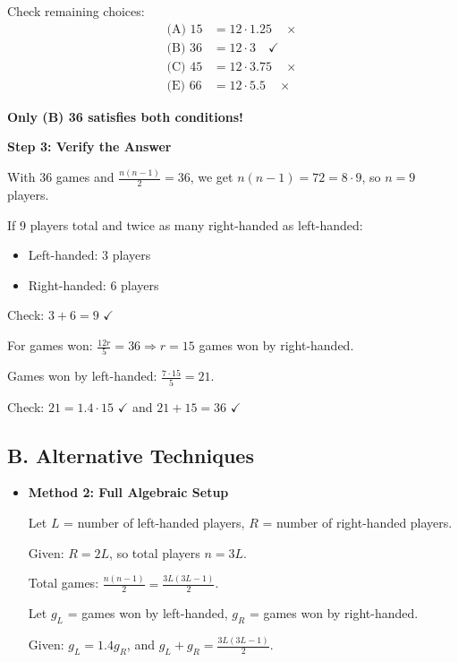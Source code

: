 \documentclass[12pt]{article}
\begin{document}
\begin{techniquesbox}
\begin{itemize}[leftmargin=*]
    Check remaining choices:
    \begin{align*}
    \text{(A) } 15 &= 12 \cdot 1.25 \quad \times\\
    \text{(B) } 36 &= 12 \cdot 3 \quad \checkmark\\
    \text{(C) } 45 &= 12 \cdot 3.75 \quad \times\\
    \text{(E) } 66 &= 12 \cdot 5.5 \quad \times
    \end{align*}
    
    \textbf{Only (B) 36 satisfies both conditions!}
    
    \textbf{Step 3: Verify the Answer}
    
    With 36 games and $\frac{n(n-1)}{2} = 36$, we get $n(n-1) = 72 = 8 \cdot 9$, so $n = 9$ players.
    
    If 9 players total and twice as many right-handed as left-handed:
    \begin{itemize}
        \item Left-handed: 3 players
        \item Right-handed: 6 players
    \end{itemize}
    
    Check: $3 + 6 = 9$ $\checkmark$
    
    For games won: $\frac{12r}{5} = 36 \Rightarrow r = 15$ games won by right-handed.
    
    Games won by left-handed: $\frac{7 \cdot 15}{5} = 21$.
    
    Check: $21 = 1.4 \cdot 15$ $\checkmark$ and $21 + 15 = 36$ $\checkmark$
\end{itemize}

\subsection*{B. Alternative Techniques}
\begin{itemize}[leftmargin=*]
    \item \textbf{Method 2: Full Algebraic Setup}
    
    Let $L$ = number of left-handed players, $R$ = number of right-handed players.
    
    Given: $R = 2L$, so total players $n = 3L$.
    
    Total games: $\frac{n(n-1)}{2} = \frac{3L(3L-1)}{2}$.
    
    Let $g_L$ = games won by left-handed, $g_R$ = games won by right-handed.
    
    Given: $g_L = 1.4g_R$, and $g_L + g_R = \frac{3L(3L-1)}{2}$.
    

\end{itemize}
\end{techniquesbox}
\end{document}
